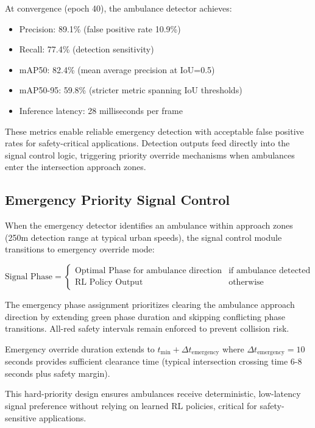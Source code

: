 \documentclass[10pt,conference]{IEEEtran}
\begin{document}
At convergence (epoch 40), the ambulance detector achieves:
\begin{itemize}
    \item Precision: 89.1\% (false positive rate 10.9\%)
    \item Recall: 77.4\% (detection sensitivity)
    \item mAP50: 82.4\% (mean average precision at IoU=0.5)
    \item mAP50-95: 59.8\% (stricter metric spanning IoU thresholds)
    \item Inference latency: 28 milliseconds per frame
\end{itemize}

These metrics enable reliable emergency detection with acceptable false positive rates for safety-critical applications. Detection outputs feed directly into the signal control logic, triggering priority override mechanisms when ambulances enter the intersection approach zones.

\subsection{Emergency Priority Signal Control}

When the emergency detector identifies an ambulance within approach zones (250m detection range at typical urban speeds), the signal control module transitions to emergency override mode:

\begin{equation}
\text{Signal Phase} = \begin{cases}
\text{Optimal Phase for ambulance direction} & \text{if ambulance detected} \\
\text{RL Policy Output} & \text{otherwise}
\end{cases}
\end{equation}

The emergency phase assignment prioritizes clearing the ambulance approach direction by extending green phase duration and skipping conflicting phase transitions. All-red safety intervals remain enforced to prevent collision risk.

Emergency override duration extends to $t_{\text{min}} + \Delta t_{\text{emergency}}$ where $\Delta t_{\text{emergency}} = 10$ seconds provides sufficient clearance time (typical intersection crossing time 6-8 seconds plus safety margin).

This hard-priority design ensures ambulances receive deterministic, low-latency signal preference without relying on learned RL policies, critical for safety-sensitive applications.
\end{document}
